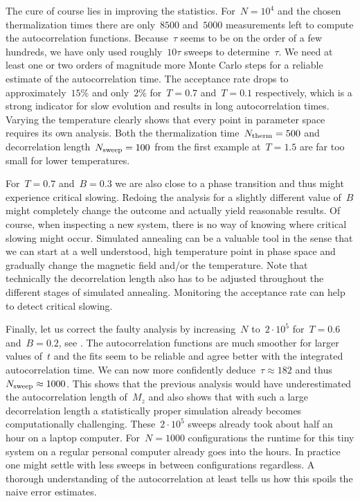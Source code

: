 The cure of course lies in improving the statistics. For~$N=10^4$ and the chosen
thermalization times there are only~$8500$ and~$5000$ measurements left to
compute the autocorrelation functions. Because~$\tau$ seems to be on the order
of a few hundreds, we have only used roughly~$10 \tau$ sweeps to
determine~$\tau$. We need at least one or two orders of magnitude more Monte
Carlo steps for a reliable estimate of the autocorrelation time. The acceptance
rate drops to approximately~$15$\% and only~$2$\% for~$T=0.7$ and~$T=0.1$
respectively, which is a strong indicator for slow evolution and results in long
autocorrelation times. Varying the temperature clearly shows that every point in
parameter space requires its own analysis. Both the thermalization
time~$N_{\mathrm{therm}}=500$ and decorrelation length~$N_{\mathrm{sweep}}=100$ from the first example
at~$T=1.5$ are far too small for lower temperatures.

For~$T=0.7$ and~$B=0.3$ we are also close to a phase transition and thus might
experience critical slowing. Redoing the analysis for a slightly different
value of~$B$ might completely change the outcome and actually yield reasonable
results. Of course, when inspecting a new system, there is no way of knowing
where critical slowing might occur. Simulated annealing can be a valuable tool
in the sense that we can start at a well understood, high temperature point in
phase space and gradually change the magnetic field and/or the temperature. Note
that technically the decorrelation length also has to be adjusted throughout the
different stages of simulated annealing. Monitoring the acceptance rate can help
to detect critical slowing.

Finally, let us correct the faulty analysis by increasing~$N$ to~$2\cdot 10^5$
for~$T=0.6$ and~$B=0.2$, see . The autocorrelation
functions are much smoother for larger values of~$t$ and the fits seem to be
reliable and agree better with the integrated autocorrelation time. We can now
more confidently deduce~$\tau \approx 182$ and thus~$N_{\mathrm{sweep}} \approx 1000$. This
shows that the previous analysis would have underestimated the autocorrelation
length of~$M_z$ and also shows that with such a large decorrelation length a
statistically proper simulation already becomes computationally challenging.
These~$2\cdot 10^5$ sweeps already took about half an hour on a laptop computer.
For~$N=1000$ configurations the runtime for this tiny system on a regular
personal computer already goes into the hours. In practice one might settle with
less sweeps in between configurations regardless. A thorough understanding of
the autocorrelation at least tells us how this spoils the naive error estimates.

